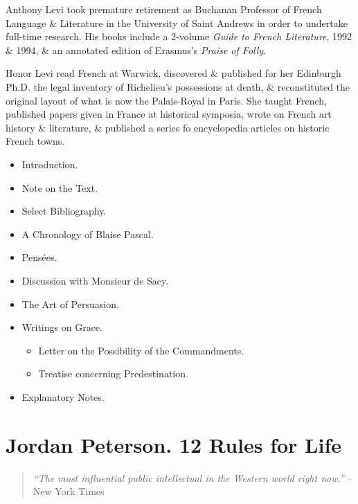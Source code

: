 \documentclass{article}
\begin{document}
\begin{enumerate}
	{\sc Anthony Levi} took premature retirement as Buchanan Professor of French Language \& Literature in the University of Saint Andrews in order to undertake full-time research. His books include a 2-volume {\it Guide to French Literature}, 1992 \& 1994, \& an annotated edition of {\sc Erasmus}'s {\it Praise of Folly}.
	
	{\sc Honor Levi} read French at Warwick, discovered \& published for her Edinburgh Ph.D. the legal inventory of Richelieu's possessions at death, \& reconstituted the original layout of what is now the Palais-Royal in Paris. She taught French, published papers given in France at historical symposia, wrote on French art history \& literature, \& published a series fo encyclopedia articles on historic French towns.
	\begin{itemize}
		\item {\sf Introduction.}
		\item {\sf Note on the Text.}
		\item {\sf Select Bibliography.}
		\item {\sf A Chronology of {\sc Blaise Pascal}.}
		\item {\sf Pens\'ees.}
		\item {\sf Discussion with Monsieur de Sacy.}
		\item {\sf The Art of Persuasion.}
		\item {\sf Writings on Grace.}
		\begin{itemize}
			\item {\sf Letter on the Possibility of the Commandments.}
			\item {\sf Treatise concerning Predestination.}
		\end{itemize}
		\item {\sf Explanatory Notes.}
	\end{itemize}
\end{enumerate}


\section{Jordan Peterson. 12 Rules for Life}

\begin{quotation}
	\textit{``The most influential public intellectual in the Western world right now.''} -- New York Times
\end{quotation}
\end{document}
